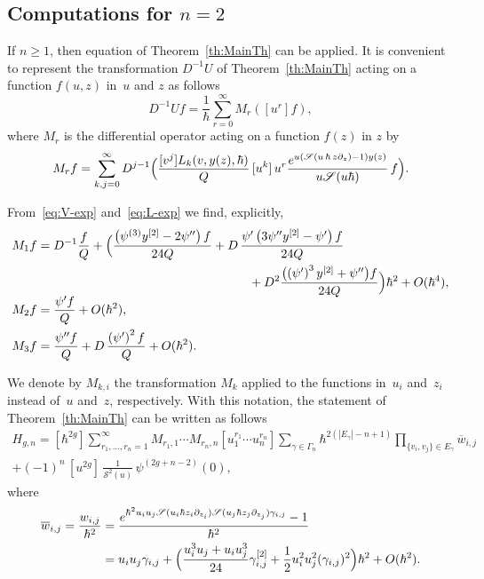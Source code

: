 \documentclass[JEP,XML,SOM,Unicode,NoEqCountersInSection,NoFloatCountersInSection]{cedram}
\let\mathcal\mathscr
\theoremstyle{plain}
\theoremstyle{definition}
\theoremstyle{remark}
\newcommand{\cS}{\mathcal{S}}
\begin{document}
\subsection{Computations for \texorpdfstring{$n=2$}{n=2}}
If $n\ge1$, then equation of Theorem~\ref{th:MainTh} can be applied.
It is convenient to represent the transformation $D^{-1}U$ of Theorem~\ref{th:MainTh} acting on a function $f(u,z)$ in~$u$ and $z$ as follows
\begin{equation*}
D^{-1}U f=\frac1{\hbar}\sum_{r=0}^\infty M_r([u^r]f),
\end{equation*}
where $M_r$ is the differential operator acting on a function $f(z)$ in $z$ by
\begin{equation*}
M_rf=\sum_{k,j=0}^\infty D^{j-1}\Bigl(\frac{[v^j] L_{k}(v,y(z),\hbar)}{Q}\,[u^k]\,u^r\frac{e^{u(\cS(u\,\hbar\,z\partial_z)-1)y(z)}}{u \cS(u\hbar)}\,f\Bigr).
\end{equation*}

From~\eqref{eq:V-exp} and~\eqref{eq:L-exp} we find, explicitly,
\begin{align*}
M_1f&=D^{-1}\frac{f}{Q}+
\Bigl(\frac{\left(\psi^{(3)} y^{[2]}-2 \psi''\right)f}{24Q}
+ D\,\frac{\psi' \left(3 \psi'' y^{[2]}-\psi'\right)f}{24Q}\\
&\hspace*{6cm}
+ D^2\frac{\bigl(\left(\psi'\right)^3 y^{[2]}+\psi''\bigr)f}{24Q}
\Bigr)\hbar ^2 +O(\hbar^4),\\[-5pt]
M_2f&=\frac{\psi'f}{Q}+O(\hbar^2),\\
M_3f&=
\frac{\psi''f}{Q}
+D\,\frac{\left(\psi'\right)^2f}{Q}
+O(\hbar^2).
\end{align*}

We denote by $M_{k,i}$ the transformation $M_k$ applied to the functions in~$u_i$ and~$z_i$ instead of~$u$ and~$z$, respectively. With this notation, the statement of Theorem~\ref{th:MainTh} can be written as follows
\begin{multline*}
H_{g,n} = [\hbar^{2g}] \sum_{r_1,\dots,r_n=1}^\infty M_{r_1,1}\cdots M_{r_n,n} [u_1^{r_1}\cdots u_n^{r_n}]
\sum\limits_{\gamma\in\Gamma_n}\hbar^{2(|E_\gamma|-n+1)}\prod\limits_{\{v_i,v_j\}\in E_\gamma} \overline w_{i,j}\\
+ (-1)^{n}\,[u^{2g}]\,\frac1{\cS^2(u)}\,\psi^{(2g+n-2)}(0),
\end{multline*}
where
\begin{align*}
\overline w_{i,j}=\frac{w_{i,j}}{\hbar^2}& =\frac{e^{\hbar^2u_iu_j\cS(u_i\hbar z_i\partial_{z_i})\cS(u_j\hbar z_j\partial_{z_j})\gamma_{i,j}}-1}{\hbar^{2}}\\
&=u_iu_j\gamma_{i,j}+ \Bigl(\frac{u_i^3u_j+u_iu_j^3}{24}\gamma_{i,j}^{[2]}
+\frac12 u_i^2u_j^2(\gamma_{i,j})^2 \Bigr)\hbar^2+O(\hbar^2).
\end{align*}
\end{document}
